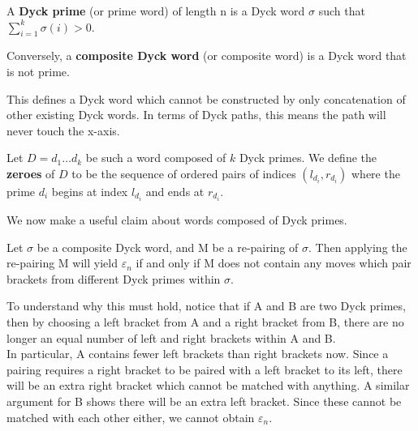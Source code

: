 \begin{definition}
    A \textbf{Dyck prime} (or prime word) of length n is a Dyck word $\sigma$ such that $\sum_{i = 1}^{k} \sigma(i) > 0$.

    Conversely, a \textbf{composite Dyck word} (or composite word) is a Dyck word that is not prime. 
\end{definition}

This defines a Dyck word which cannot be constructed by only concatenation of other existing Dyck words. In terms of Dyck paths, this means the path will never touch the x-axis. 

\begin{definition}
    Let $D = d_1\dots d_k$ be such a word composed of $k$ Dyck primes. We define the \textbf{zeroes} of $D$ to be the sequence of ordered pairs of indices $(l_{d_i}, r_{d_i})$ where the prime $d_i$ begins at index $l_{d_i}$ and ends at $r_{d_i}$.
\end{definition} 

We now make a useful claim about words composed of Dyck primes.

\begin{claim}
    \label{claim:samePrime}
    Let $\sigma$ be a composite Dyck word, and M be a re-pairing of $\sigma$. Then applying the re-pairing M will yield $\varepsilon_n$ if and only if M does not contain any moves which pair brackets from different Dyck primes within $\sigma$.
\end{claim}
To understand why this must hold, notice that if A and B are two Dyck primes, then by choosing a left bracket from A and a right bracket from B, there are no longer an equal number of left and right brackets within A and B. 
\\ In particular, A contains fewer left brackets than right brackets now. Since a pairing requires a right bracket to be paired with a left bracket to its left, there will be an extra right bracket which cannot be matched with anything. A similar argument for B shows there will be an extra left bracket. Since these cannot be matched with each other either, we cannot obtain $\varepsilon_n$. 
